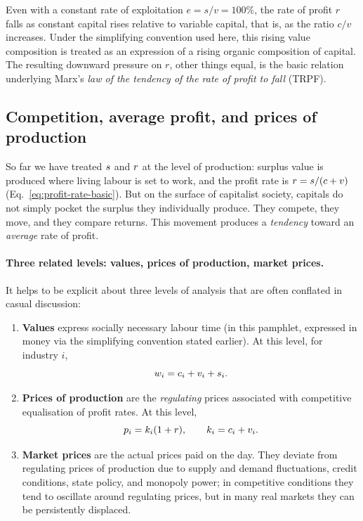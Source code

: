 Even with a constant rate of exploitation \(e=s/v=100\%\), the rate of profit \(r\) falls as constant capital rises relative to variable capital, that is, as the ratio \(c/v\) increases. Under the simplifying convention used here, this rising value composition is treated as an expression of a rising organic composition of capital. The resulting downward pressure on \(r\), other things equal, is the basic relation underlying Marx's \emph{law of the tendency of the rate of profit to fall} (TRPF).\cite{Roberts2016,Shaikh2016}

\subsection{Competition, average profit, and prices of production}
\label{sec:prices-production}

So far we have treated $s$ and $r$ at the level of production:
surplus value is produced where living labour is set to work, and the profit rate
is $r = s/(c+v)$ (Eq.~\eqref{eq:profit-rate-basic}).
But on the surface of capitalist society, capitals do not simply pocket the surplus
they individually produce. They compete, they move, and they compare returns.
This movement produces a \emph{tendency} toward an \emph{average} rate of profit.

\paragraph{Three related levels: values, prices of production, market prices.}
It helps to be explicit about three levels of analysis that are often conflated in casual discussion:

\begin{enumerate}[leftmargin=1.5em]
  \item \textbf{Values} express socially necessary labour time (in this pamphlet, expressed in money via the simplifying convention stated earlier). At this level, for industry $i$,
  \[
    w_i = c_i + v_i + s_i.
  \]
  \item \textbf{Prices of production} are the \emph{regulating} prices associated with competitive equalisation of profit rates. At this level,
  \[
    p_i = k_i(1+r), \qquad k_i = c_i + v_i.
  \]
  \item \textbf{Market prices} are the actual prices paid on the day. They deviate from regulating prices of production due to supply and demand fluctuations, credit conditions, state policy, and monopoly power; in competitive conditions they tend to oscillate around regulating prices, but in many real markets they can be persistently displaced.
\end{enumerate}

